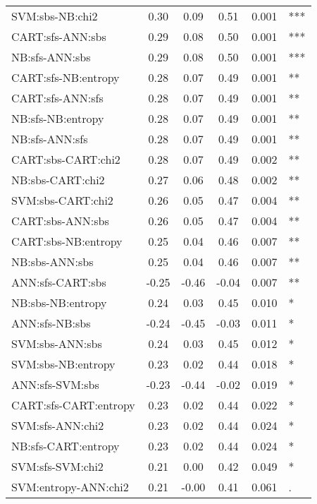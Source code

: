 \begin{center}
\begin{longtable}{|l|c|c|c|c|l}
          SVM:sbs-NB:chi2 &   0.30 &   0.09 &   0.51 &  0.001 &  *** \\
         CART:sfs-ANN:sbs &   0.29 &   0.08 &   0.50 &  0.001 &  *** \\
           NB:sfs-ANN:sbs &   0.29 &   0.08 &   0.50 &  0.001 &  *** \\
      CART:sfs-NB:entropy &   0.28 &   0.07 &   0.49 &  0.001 &   ** \\
         CART:sfs-ANN:sfs &   0.28 &   0.07 &   0.49 &  0.001 &   ** \\
        NB:sfs-NB:entropy &   0.28 &   0.07 &   0.49 &  0.001 &   ** \\
           NB:sfs-ANN:sfs &   0.28 &   0.07 &   0.49 &  0.001 &   ** \\
       CART:sbs-CART:chi2 &   0.28 &   0.07 &   0.49 &  0.002 &   ** \\
         NB:sbs-CART:chi2 &   0.27 &   0.06 &   0.48 &  0.002 &   ** \\
        SVM:sbs-CART:chi2 &   0.26 &   0.05 &   0.47 &  0.004 &   ** \\
         CART:sbs-ANN:sbs &   0.26 &   0.05 &   0.47 &  0.004 &   ** \\
      CART:sbs-NB:entropy &   0.25 &   0.04 &   0.46 &  0.007 &   ** \\
           NB:sbs-ANN:sbs &   0.25 &   0.04 &   0.46 &  0.007 &   ** \\
         ANN:sfs-CART:sbs &  -0.25 &  -0.46 &  -0.04 &  0.007 &   ** \\
        NB:sbs-NB:entropy &   0.24 &   0.03 &   0.45 &  0.010 &    * \\
           ANN:sfs-NB:sbs &  -0.24 &  -0.45 &  -0.03 &  0.011 &    * \\
          SVM:sbs-ANN:sbs &   0.24 &   0.03 &   0.45 &  0.012 &    * \\
       SVM:sbs-NB:entropy &   0.23 &   0.02 &   0.44 &  0.018 &    * \\
          ANN:sfs-SVM:sbs &  -0.23 &  -0.44 &  -0.02 &  0.019 &    * \\
    CART:sfs-CART:entropy &   0.23 &   0.02 &   0.44 &  0.022 &    * \\
         SVM:sfs-ANN:chi2 &   0.23 &   0.02 &   0.44 &  0.024 &    * \\
      NB:sfs-CART:entropy &   0.23 &   0.02 &   0.44 &  0.024 &    * \\
         SVM:sfs-SVM:chi2 &   0.21 &   0.00 &   0.42 &  0.049 &    * \\
     SVM:entropy-ANN:chi2 &   0.21 &  -0.00 &   0.41 &  0.061 &    . \\

\end{longtable}
\end{center}
